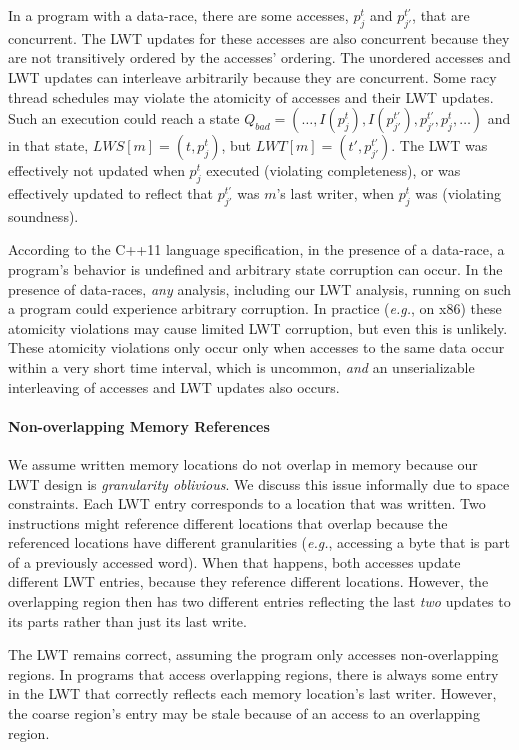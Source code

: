 \documentclass[preprint,10pt]{sigplanconf}
\newcommand{\lwt}{LWT\xspace}
\begin{document}
In a program with a data-race, there are some accesses, $p^{t}_{j}$ and
$p^{t'}_{j'}$, that are concurrent.  The \lwt updates for these accesses are
also concurrent because they are not transitively ordered by the accesses' ordering.  The unordered accesses and \lwt updates can interleave arbitrarily
because they are concurrent.  Some racy thread schedules may violate the
atomicity of accesses and their \lwt updates.  Such an execution could reach a
state $Q_{bad} = (\ldots, I(p^{t}_{j}), I(p^{t'}_{j'}), p^{t'}_{j'}, p^{t}_{j},
\ldots)$ and in that state, $LWS[m] = (t,p^{t}_{j})$, but $LWT[m] =
(t',p^{t'}_{j'})$.  The \lwt was effectively not updated when $p^{t}_{j}$
executed (violating completeness), or was effectively updated to reflect that
$p^{t'}_{j'}$ was $m$'s last writer, when $p^{t}_{j}$ was (violating
soundness).    

According to the C++11 language specification, in the presence of a data-race,
a program's behavior is undefined and arbitrary state corruption can occur.  In
the presence of data-races, {\em any} analysis, including our \lwt analysis,
running on such a program could experience arbitrary corruption.  In practice
({\em e.g.}, on x86) these atomicity violations may cause limited \lwt
corruption, but even this is unlikely.  These atomicity violations only occur
only when accesses to the same data occur within a very short time interval,
which is uncommon, {\em and} an unserializable interleaving of accesses and
\lwt updates also occurs.

\paragraph{Non-overlapping Memory References} 
We assume written memory locations do not overlap in memory because our \lwt
design is {\em granularity oblivious}.  We discuss this issue informally due to
space constraints.  Each \lwt entry corresponds to a location that was written.
Two instructions might reference different locations that overlap because the
referenced locations have different granularities ({\em e.g.}, accessing a byte
that is part of a previously accessed word).  When that happens, both accesses
update different \lwt entries, because they reference different locations.
However, the overlapping region then has two different entries reflecting the
last {\em two} updates to its parts rather than just its last write.

The \lwt remains correct, assuming the program only accesses non-overlapping
regions.  In programs that access overlapping regions, there is always some
entry in the \lwt that correctly reflects each memory location's last writer.
However, the coarse region's entry may be stale because of an
access to an overlapping region.
\end{document}
